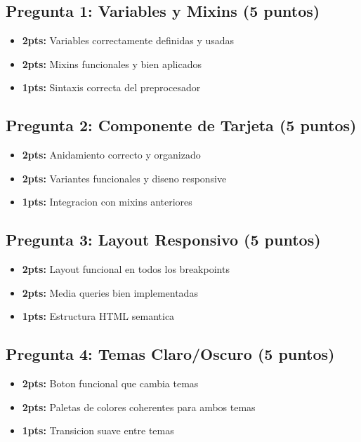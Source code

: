 \documentclass[12pt, a4paper]{article}
\begin{document}
\subsection*{Pregunta 1: Variables y Mixins (5 puntos)}
\begin{itemize}
\item \textbf{2pts:} Variables correctamente definidas y usadas
\item \textbf{2pts:} Mixins funcionales y bien aplicados
\item \textbf{1pts:} Sintaxis correcta del preprocesador
\end{itemize}

\subsection*{Pregunta 2: Componente de Tarjeta (5 puntos)}
\begin{itemize}
\item \textbf{2pts:} Anidamiento correcto y organizado
\item \textbf{2pts:} Variantes funcionales y diseno responsive
\item \textbf{1pts:} Integracion con mixins anteriores
\end{itemize}

\subsection*{Pregunta 3: Layout Responsivo (5 puntos)}
\begin{itemize}
\item \textbf{2pts:} Layout funcional en todos los breakpoints
\item \textbf{2pts:} Media queries bien implementadas
\item \textbf{1pts:} Estructura HTML semantica
\end{itemize}

\subsection*{Pregunta 4: Temas Claro/Oscuro (5 puntos)}
\begin{itemize}
\item \textbf{2pts:} Boton funcional que cambia temas
\item \textbf{2pts:} Paletas de colores coherentes para ambos temas
\item \textbf{1pts:} Transicion suave entre temas
\end{itemize}
\end{document}
